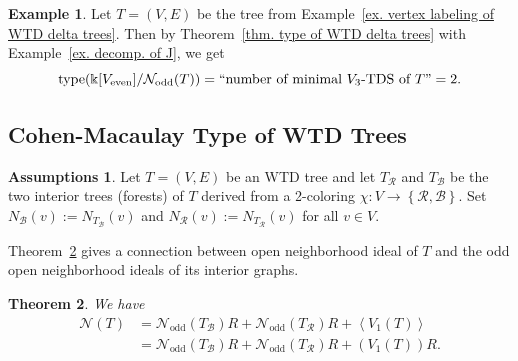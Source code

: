 \documentclass[12pt, reqno]{amsart}
\theoremstyle{definition}
\newtheorem*{assumptions}{Assumptions}
\theoremstyle{plain}
\newtheorem{theorem}{Theorem}[subsection]
\theoremstyle{definition}
\newtheorem{example}[theorem]{Example}
\newcommand{\tp}{\mbox{type}}
\newcommand{\R}{\mathcal{R}}
\newcommand{\B}{\mathcal{B}}
\newcommand{\kk}{\Bbbk}
\newcommand\gen[1]{\left\langle #1 \right\rangle}
\newcommand\set[1]{\left\lbrace #1 \right\rbrace}
\newcommand{\NN}{\mathcal{N}}
\begin{document}
\begin{example}
    Let $T = (V,E)$ be the tree from Example~\ref{ex. vertex labeling of WTD delta trees}.
    Then by Theorem~\ref{thm. type of WTD delta trees} with Example~\ref{ex. decomp. of J}, we get
    $$
    \tp(\kk[V_{\text{even}}]/\NN_{\text{odd}}(T)) = ``\mbox{number of minimal $V_3$-TDS of } T" = 2.
    $$
\end{example}

\subsection{Cohen-Macaulay Type of WTD Trees}

\begin{assumptions}
Let $T = (V,E)$ be an WTD tree and let $T_\R$ and $T_\B$ be the two interior trees (forests) of $T$ derived from a 2-coloring $\chi: V \to \set{\R,\B}$.
Set $ N_\B(v) := N_{T_\B}(v)$ and $N_\R(v) := N_{T_\R}(v)$ for all $v \in V$.    
\end{assumptions}

Theorem~\ref{Decomposition of ONI into three ideals} gives a connection between open neighborhood ideal of $T$ and the odd open neighborhood ideals of its interior graphs.

\begin{theorem}\label{Decomposition of ONI into three ideals}
We have
\begin{align*}
\NN(T) &= \NN_{\text{odd}}(T_\B)R + \NN_{\text{odd}}(T_\R)R + \gen{V_1(T)}\\ 
&= \NN_{\text{odd}}(T_\B)R + \NN_{\text{odd}}(T_\R)R + (V_1(T))R.
\end{align*}
\end{theorem}
\end{document}
